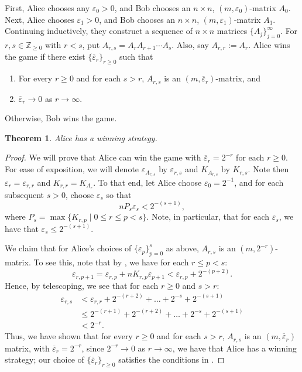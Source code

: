 \documentclass[11pt, letterpaper]{amsart}
\theoremstyle{plain}
\newtheorem{theorem}{Theorem}[section]
\theoremstyle{definition}
\renewcommand{\epsilon}{\varepsilon}
\newcommand{\eps}{\epsilon}
\newcommand{\ov}[1]{\overline{#1}}
\begin{document}
First, Alice chooses any $\eps_0 > 0$, and Bob chooses an $n \times n$,
$(m,\eps_0)$-matrix $A_0$. Next, Alice chooses $\eps_1>0$, and
Bob chooses an $n \times n$, $(m,\eps_1)$-matrix $A_1$. Continuing
inductively, they construct a sequence of $n \times n$ matrices
$\{A_j\}_{j=0}^\infty$. For $r, s\in \mathbb{Z}_{\geq 0}$ with $r<s$, put
$A_{r,s} = A_rA_{r+1}\cdots A_s$. Also, say $A_{r,r}:= A_r$.
Alice wins the game if there exist $\{\ov{\eps}_r\}_{r \ge 0}$ such that 
\begin{winninglist}
\begin{enumerate}
\item For every $r \ge 0$ and
  for each $s>r$, $A_{r,s}$ is an $(m,\ov{\eps}_r)$-matrix, and
\item $\ov{\eps}_r \to 0$ as $r \to \infty$.
\end{enumerate}
\caption{Conditions on $\{\ov{\eps}_r\}_{r \ge 0}$ for Alice to win the Alice-Bob game.}
\label{list:Alice_win_folding}
\end{winninglist}
Otherwise, Bob wins the game.

\begin{theorem}\label{thm:TheGame_folding}
  Alice has a winning strategy.
\end{theorem}

\begin{proof}
    We will prove that Alice can win the game with $\ov\eps_r = 2^{-r}$ for each
    $r\geq 0$. For ease of exposition, we will denote $\eps_{A_{r, s}}$ by
    $\eps_{r, s}$ and $K_{A_{r,s}}$ by $K_{r, s}$. Note then $\eps_r =
    \eps_{r,r}$ and $K_{r,r}=K_{A_r}$. To that end, let Alice choose $\eps_0 =
    2^{-1}$, and for each subsequent $s > 0$, choose $\eps_s$ so
    that \[
      nP_s\eps_s < 2^{-(s+1)},
    \] where $P_s = \max\{K_{r,p} \mid 0 \le r \le p < s\}$. Note, in particular, that for each $\eps_s$, we
    have that $\eps_s \leq 2^{-(s+1)}$.

    We claim that for Alice's choices of $\{\eps_p\}_{p=0}^s$ as above, $A_{r,
      s}$ is an $(m, 2^{-r})$-matrix. To see this, note that by
    , we have for each $r \le p <s$:
    \[
      \eps_{r,p+1} = \eps_{r,p} + nK_{r,p}\eps_{p+1} < \eps_{r,p} + 2^{-(p+2)}.
    \]
    Hence, by telescoping, we see that for each $r \ge 0$ and $s>r$:
    \begin{align*}
        \eps_{r, s} &< \eps_{r,r} + 2^{-(r+2)} + \ldots + 2^{-s} + 2^{-(s+1)} \\
        &\le 2^{-(r+1)} +  2^{-(r+2)} + \ldots + 2^{-s} + 2^{-(s+1)} \\
        &< 2^{-r}.
    \end{align*}
    Thus, we have shown that for every $r\geq 0$ and for each $s > r$, $A_{r, s}$ is an $(m, \ov\eps_r)$ matrix, with $\ov\eps_r = 2^{-r}$, since $2^{-r} \to 0$ as $r\to \infty$, we have that Alice has a winning strategy; our choice of $\{\ov{\eps}_r\}_{r \ge 0}$ satisfies the conditions in .
\end{proof}
\end{document}
